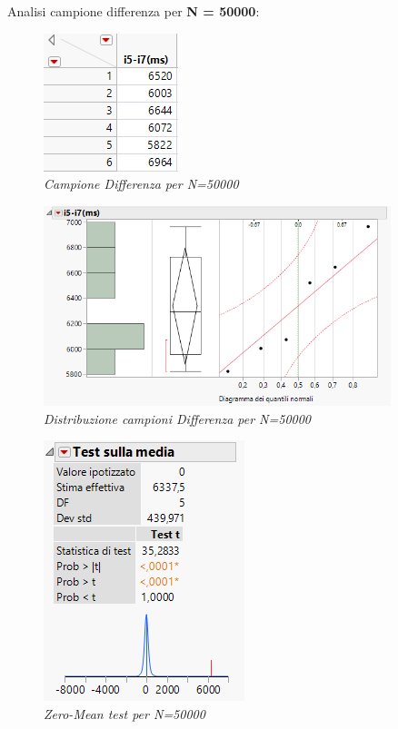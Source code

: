 Analisi campione differenza per \textbf{N = 50000}:
\begin{figure}[H]
	\centering
	\includegraphics{img/hw0/diff3.png}
	\caption{\textit{Campione Differenza per N=50000}}
\end{figure}
\begin{figure}[H]
	\centering
	\includegraphics[width=0.9\textwidth]{img/hw0/statistiche50000.png}
	\caption{\textit{Distribuzione campioni Differenza per N=50000}}
\end{figure}
\begin{figure}[H]
	\centering
	\includegraphics{img/hw0/test50000.png}
	\caption{\textit{Zero-Mean test per N=50000}}
\end{figure}

